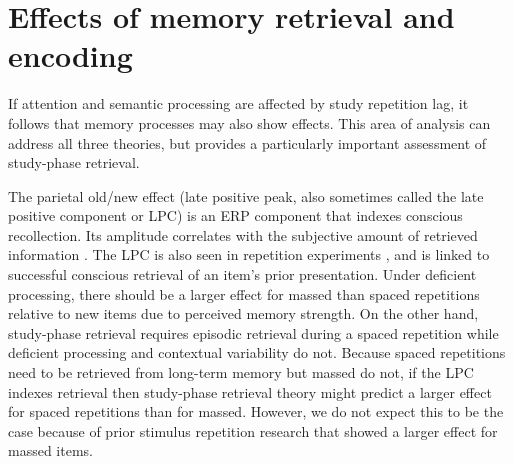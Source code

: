 
\section{Effects of memory retrieval and encoding}

If attention and semantic processing are affected by study repetition lag, it follows that memory processes may also show effects.  This area of analysis
can address all three theories, but provides a particularly important assessment of study-phase retrieval.



The parietal old/new effect (late positive peak, also sometimes called the late positive component or LPC) is an ERP component that indexes conscious recollection.  Its amplitude correlates with the subjective amount of retrieved information \cite{VilbEtal2006,Wild2000,WildRugg1996}.
The LPC is also seen in repetition experiments \cite{OlicEtal2000,VanSEtal2007}, and is linked to successful conscious retrieval of an item's prior presentation.
Under deficient processing,
there should be a larger effect for massed than spaced repetitions relative to new items due to perceived memory strength.
On the other hand, study-phase retrieval requires episodic retrieval during a spaced repetition while deficient processing and contextual variability do not.  \cbstart  Because spaced repetitions need to be retrieved from long-term memory but massed do not, if the LPC indexes retrieval then study-phase retrieval theory might predict a larger effect for spaced repetitions than for massed.  However, we do not expect this to be the case because of prior stimulus repetition research that showed a larger effect for massed items.
\cbend

